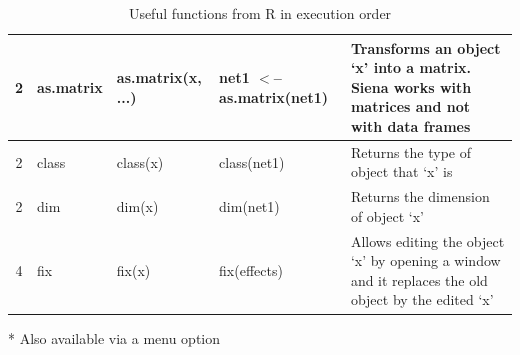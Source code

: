 \documentclass[a4paper,fleqn,11pt]{article}
\newcommand{\+}{\, + \,}
\newcommand{\R}{{\sf R }}
\begin{document}
\begin{table}
\begin{threeparttable}
\begin{small}
\begin{tabular}{c | l | p{3cm} | p{3cm} | p{12cm} }
\hline 2 &  as.matrix   &as.matrix(x, ...)   &net1 $<$-- \newline as.matrix(net1) &
Transforms an object `x' into a matrix. Siena works with matrices and
not with data frames\\
\hline 2&  class &   class(x)  & class(net1)  & Returns the type of object that
`x' is\\
\hline
2&   dim  & dim(x)  & dim(net1) &  Returns the dimension of object `x'\\
\hline 4 &   fix\tnote{*}  & fix(x) &  fix(effects) &  Allows editing the
object `x'
 by opening a window and it replaces the old object by the edited `x'\\
\hline
\end{tabular}
\caption[Functions from \R in order of execution] {Useful functions from \R in
execution order} \label{tab:FuncExR}
\begin{tablenotes}
\item [*] Also available via a menu option
\end{tablenotes}
\end{small}
\end{threeparttable}
\end{table}
\end{document}
